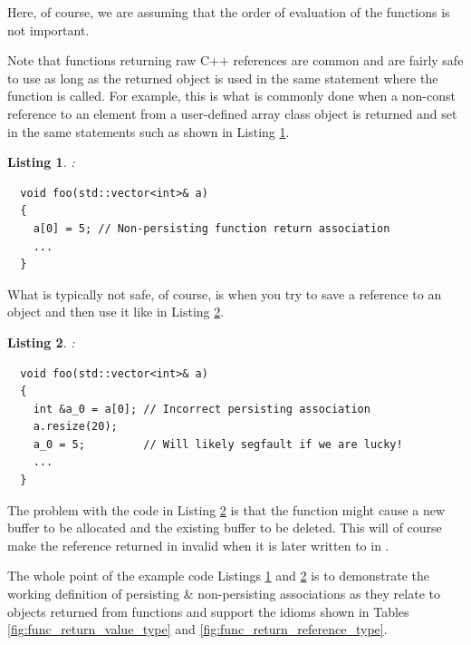 \documentclass[pdf,ps2pdf,11pt]{SANDreport}
\newtheorem{listing}{Listing}
\begin{document}
Here, of course, we are assuming that the order of evaluation of the
functions is not important.

Note that functions returning raw C++ references are common and are
fairly safe to use as long as the returned object is used in the same
statement where the function is called.  For example, this is what is
commonly done when a non-const reference to an element from a
user-defined array class object is returned and set in the same
statements such as shown in Listing
{}\ref{listing:non-persisting-array-return-1}.

\begin{listing}:\\
\label{listing:non-persisting-array-return-1}
{\small\begin{verbatim}
  void foo(std::vector<int>& a)
  {
    a[0] = 5; // Non-persisting function return association
    ...
  }
\end{verbatim}}
\end{listing}

What is typically not safe, of course, is when you try to save a
reference to an object and then use it like in Listing
{}\ref{listing:bad-persisting-array-return-1}.

\begin{listing}:\\
\label{listing:bad-persisting-array-return-1}
{\small\begin{verbatim}
  void foo(std::vector<int>& a)
  {
    int &a_0 = a[0]; // Incorrect persisting association
    a.resize(20);
    a_0 = 5;         // Will likely segfault if we are lucky!
    ...
  }
\end{verbatim}}
\end{listing}

The problem with the code in Listing
{}\ref{listing:bad-persisting-array-return-1} is that the
{} function might cause a new buffer to be
allocated and the existing buffer to be deleted.  This will of course
make the reference returned in {} invalid
when it is later written to in {}.

The whole point of the example code Listings
{}\ref{listing:non-persisting-array-return-1} and
{}\ref{listing:bad-persisting-array-return-1} is to demonstrate the
working definition of persisting \& non-persisting associations as
they relate to objects returned from functions and support the idioms
shown in Tables {}\ref{fig:func_return_value_type} and
{}\ref{fig:func_return_reference_type}.
\end{document}
